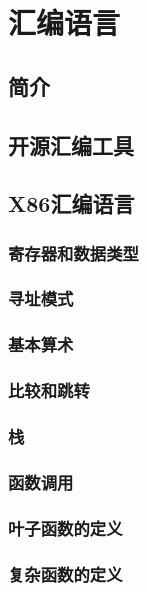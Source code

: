 \documentclass[cn,11pt,chinese]{elegantbook}
\begin{document}
\chapter{汇编语言}

\section{简介}

\section{开源汇编工具}

\section{X86汇编语言}

\subsection{寄存器和数据类型}

\subsection{寻址模式}

\subsection{基本算术}

\subsection{比较和跳转}

\subsection{栈}

\subsection{函数调用}

\subsection{叶子函数的定义}

\subsection{复杂函数的定义}
\end{document}
